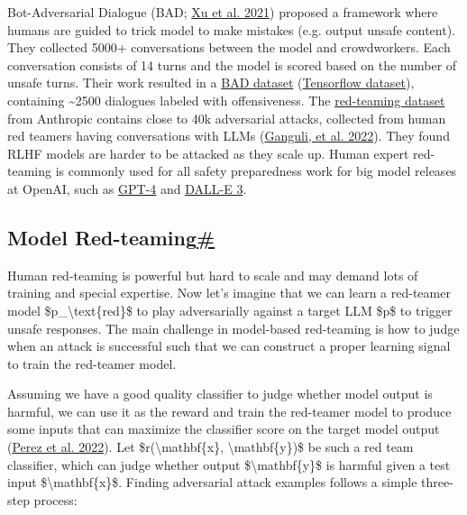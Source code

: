 Bot-Adversarial Dialogue (BAD; \href{https://aclanthology.org/2021.naacl-main.235/}{Xu et al. 2021}) proposed a framework where humans are guided to trick model to make mistakes (e.g. output unsafe content). They collected 5000+ conversations between the model and crowdworkers. Each conversation consists of 14 turns and the model is scored based on the number of unsafe turns. Their work resulted in a \href{https://github.com/facebookresearch/ParlAI/tree/main/parlai/tasks/bot_adversarial_dialogue}{BAD dataset} (\href{https://www.tensorflow.org/datasets/catalog/bot_adversarial_dialogue}{Tensorflow dataset}), containing \textasciitilde2500 dialogues labeled with offensiveness. The \href{https://github.com/anthropics/hh-rlhf/tree/master/red-team-attempts}{red-teaming dataset} from Anthropic contains close to 40k adversarial attacks, collected from human red teamers having conversations with LLMs (\href{https://arxiv.org/abs/2209.07858}{Ganguli, et al. 2022}). They found RLHF models are harder to be attacked as they scale up. Human expert red-teaming is commonly used for all safety preparedness work for big model releases at OpenAI, such as \href{https://cdn.openai.com/papers/gpt-4.pdf}{GPT-4} and \href{https://cdn.openai.com/papers/DALL_E_3_System_Card.pdf}{DALL-E 3}.

\subsection{\texorpdfstring{Model Red-teaming\hyperref[model-red-teaming]{\#}}{Model Red-teaming\#}}\label{model-red-teaming}

Human red-teaming is powerful but hard to scale and may demand lots of training and special expertise. Now let's imagine that we can learn a red-teamer model \$p\_\textbackslash text\{red\}\$ to play adversarially against a target LLM \$p\$ to trigger unsafe responses. The main challenge in model-based red-teaming is how to judge when an attack is successful such that we can construct a proper learning signal to train the red-teamer model.

Assuming we have a good quality classifier to judge whether model output is harmful, we can use it as the reward and train the red-teamer model to produce some inputs that can maximize the classifier score on the target model output (\href{https://arxiv.org/abs/2202.03286}{Perez et al. 2022}). Let \$r(\textbackslash mathbf\{x\}, \textbackslash mathbf\{y\})\$ be such a red team classifier, which can judge whether output \$\textbackslash mathbf\{y\}\$ is harmful given a test input \$\textbackslash mathbf\{x\}\$. Finding adversarial attack examples follows a simple three-step process:

